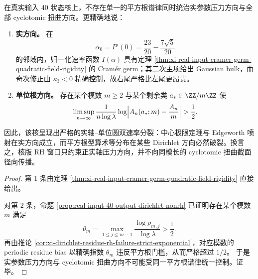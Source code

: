 \begin{corollary}\label{cor:xi-gaussian-but-nonrh-congruence-separation}
在真实输入 \(40\) 状态核上，不存在单一的平方根谱律同时统治实参数压力方向与全部 cyclotomic 扭曲方向。更精确地说：
\begin{enumerate}
  \item \textbf{实方向。} 在
  \[
  \alpha_0=P'(0)=\frac{23}{20}-\frac{7\sqrt5}{20}
  \]
  的邻域内，归一化速率函数 \(I(\alpha)\) 具有定理 \ref{thm:xi-real-input-cramer-germ-quadratic-field-rigidity} 的 Cram\'er germ；其二次主项给出 Gaussian bulk，而奇次修正由 \(\kappa_3<0\) 精确控制，故右尾严格比左尾更昂贵。
  \item \textbf{单位根方向。} 存在某个模数 \(m\ge 2\) 与某个剩余类 \(a_\ast\in\ZZ/m\ZZ\) 使
  \[
  \limsup_{n\to\infty}
  \frac{1}{n\log\lambda}
  \log\Bigl|A_n(a_\ast;m)-\frac{A_n}{m}\Bigr|
  >
  \frac12.
  \]
\end{enumerate}
因此，该核呈现出严格的实轴--单位圆双速率分裂：中心极限定理与 Edgeworth 喷射在实方向成立，而平方根型算术等分布在某些 Dirichlet 方向必然破裂。换言之，核版 RH 窗口只约束正实轴压力方向，并不向同模长的 cyclotomic 扭曲截面径向传播。
\end{corollary}
\begin{proof}
第 \(1\) 条由定理 \ref{thm:xi-real-input-cramer-germ-quadratic-field-rigidity} 直接给出。

对第 \(2\) 条，命题 \ref{prop:real-input-40-output-dirichlet-nonrh} 已证明存在某个模数 \(m\) 满足
\[
\theta_m=\max_{1\le j\le m-1}\frac{\log\rho_{m,j}}{\log\lambda}>\frac12.
\]
再由推论 \ref{cor:xi-dirichlet-residue-rh-failure-strict-exponential}，对应模数的 periodic residue bias 以精确指数 \(\theta_m\) 违反平方根门槛，从而严格超过 \(1/2\)。
于是实参数压力方向与 cyclotomic 扭曲方向不可能受同一平方根谱律统一控制。证毕。
\end{proof}










\endinput
